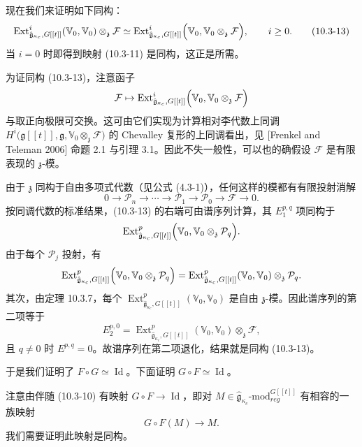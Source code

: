 现在我们来证明如下同构：
\begin{equation}
    \operatorname{Ext}^i_{\hat{\mathfrak{g}}_{\kappa_c},G[[t]]}(\mathbb{V}_0,\mathbb{V}_0)
    \otimes_{\mathfrak{z}}\mathcal{F}
    \simeq
    \operatorname{Ext}^i_{\hat{\mathfrak{g}}_{\kappa_c},G[[t]]}
    \Bigl(\mathbb{V}_0,\mathbb{V}_0\otimes_{\mathfrak{z}}\mathcal{F}\Bigr),
    \qquad i\ge0.
    \tag{10.3-13}
\end{equation}
当 $i=0$ 时即得到映射 (10.3-11) 是同构，这正是所需。

为证同构 (10.3-13)，注意函子
\[
    \mathcal{F}\mapsto\operatorname{Ext}^i_{\hat{\mathfrak{g}}_{\kappa_c},G[[t]]}
    \Bigl(\mathbb{V}_0,\mathbb{V}_0\otimes_{\mathfrak{z}}\mathcal{F}\Bigr)
\]
与取正向极限可交换。这可由它们实现为计算相对李代数上同调 $H^i\bigl(\mathfrak{g}[[t]],\mathfrak{g},\mathbb{V}_0\otimes_{\mathfrak{z}}\mathcal{F}\bigr)$ 的 Chevalley 复形的上同调看出，见 [Frenkel and Teleman 2006] 命题 2.1 与引理 3.1。因此不失一般性，可以也的确假设 $\mathcal{F}$ 是有限表现的 $\mathfrak{z}$-模。

由于 $\mathfrak{z}$ 同构于自由多项式代数（见公式 (4.3-1)），任何这样的模都有有限投射消解
\[
    0\to\mathcal{P}_n\to\cdots\to\mathcal{P}_1\to\mathcal{P}_0\to\mathcal{F}\to0.
\]
按同调代数的标准结果，(10.3-13) 的右端可由谱序列计算，其 $E^{p,q}_1$ 项同构于
\[
    \operatorname{Ext}^p_{\hat{\mathfrak{g}}_{\kappa_c},G[[t]]}
    \Bigl(\mathbb{V}_0,\mathbb{V}_0\otimes_{\mathfrak{z}}\mathcal{P}_q\Bigr).
\]
由于每个 $\mathcal{P}_j$ 投射，有
\[
    \operatorname{Ext}^p_{\hat{\mathfrak{g}}_{\kappa_c},G[[t]]}
    \Bigl(\mathbb{V}_0,\mathbb{V}_0\otimes_{\mathfrak{z}}\mathcal{P}_q\Bigr)
    =\operatorname{Ext}^p_{\hat{\mathfrak{g}}_{\kappa_c},G[[t]]}(\mathbb{V}_0,\mathbb{V}_0)
    \otimes_{\mathfrak{z}}\mathcal{P}_q.
\]
其次，由定理 10.3.7，每个 $\operatorname{Ext}^p_{\hat{\mathfrak{g}}_{\kappa_c},G[[t]]}(\mathbb{V}_0,\mathbb{V}_0)$ 是自由 $\mathfrak{z}$-模。因此谱序列的第二项等于
\[
    E^{p,0}_2=\operatorname{Ext}^p_{\hat{\mathfrak{g}}_{\kappa_c},G[[t]]}(\mathbb{V}_0,\mathbb{V}_0)
    \otimes_{\mathfrak{z}}\mathcal{F},
\]
且 $q\neq0$ 时 $E^{p,q}=0$。故谱序列在第二项退化，结果就是同构 (10.3-13)。

于是我们证明了 $F\circ G\simeq\operatorname{Id}$。下面证明 $G\circ F\simeq\operatorname{Id}$。

注意由伴随 (10.3-10) 有映射 $G\circ F\to\operatorname{Id}$，即对 $M\in\hat{\mathfrak{g}}_{\kappa_c}\text{-mod}^{G[[t]]}_{reg}$ 有相容的一族映射
\begin{equation}
    G\circ F(M)\to M.
    \tag{10.3-14}
\end{equation}
我们需要证明此映射是同构。

